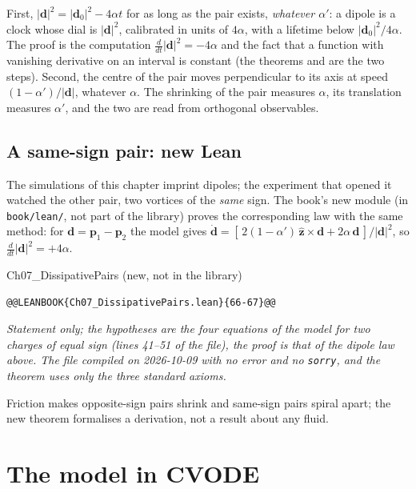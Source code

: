 First, $|\mathbf d|^2=|\mathbf d_0|^2-4\alpha t$ for as long as the pair exists, \emph{whatever $\alpha'$}: a dipole is a clock whose dial is $|\mathbf d|^2$, calibrated in units of $4\alpha$, with a lifetime below
$|\mathbf d_0|^2/4\alpha$. The proof is the computation $\frac{d}{dt}|\mathbf d|^2=-4\alpha$ and the fact that a function with vanishing derivative on an interval is constant (the theorems
 and  are the two steps). Second, the centre of the pair moves perpendicular to its axis at speed $(1-\alpha')/|\mathbf d|$, whatever $\alpha$. The shrinking of the pair measures $\alpha$, its
translation measures $\alpha'$, and the two are read from orthogonal observables.

\subsection*{A same-sign pair: new Lean}

The simulations of this chapter imprint dipoles; the experiment that opened it watched the other pair, two vortices of the \emph{same} sign. The book's new module 
(in \texttt{book/lean/}, not part of the library) proves the corresponding law with the same method: for $\mathbf d=\mathbf p_1-\mathbf p_2$ the model gives
$\dot{\mathbf d}=[\,2(1-\alpha')\,\hat{\mathbf z}\times\mathbf d+2\alpha\,\mathbf d\,]/|\mathbf d|^2$, so $\frac{d}{dt}|\mathbf d|^2=+4\alpha$.

\begin{leanbox}{Ch07\_DissipativePairs (new, not in the library)}
\begin{lstlisting}[style=lean,basicstyle=\ttfamily\footnotesize]
@@LEANBOOK{Ch07_DissipativePairs.lean}{66-67}@@
\end{lstlisting}
\nopagebreak[4]\smallskip\noindent\textit{Statement only; the hypotheses are the four equations of the model for two charges of equal sign (lines 41--51 of the file), the proof is that of the dipole law above. The file compiled on 2026-10-09 with no error and no \texttt{sorry}, and the theorem uses only the three standard axioms.}
\end{leanbox}

Friction makes opposite-sign pairs shrink and same-sign pairs spiral apart; the new theorem formalises a derivation, not a result about any fluid.

\section{The model in CVODE}\label{ch07:cvode}

